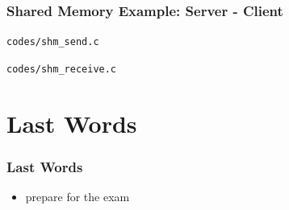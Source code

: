 \documentclass[newPxFont,sthlmFooter,nooffset]{beamer}
\begin{document}
\begin{frame}
  \frametitle{Shared Memory Example: Server - Client}
\texttt{codes/shm\_send.c}
 

\newpage
\texttt{codes/shm\_receive.c}
  
\end{frame}




\section{Last Words}

\begin{frame}[t]
  \frametitle{Last Words}

\begin{itemize}
\item prepare for the exam
\end{itemize}
\end{frame}
\end{document}
